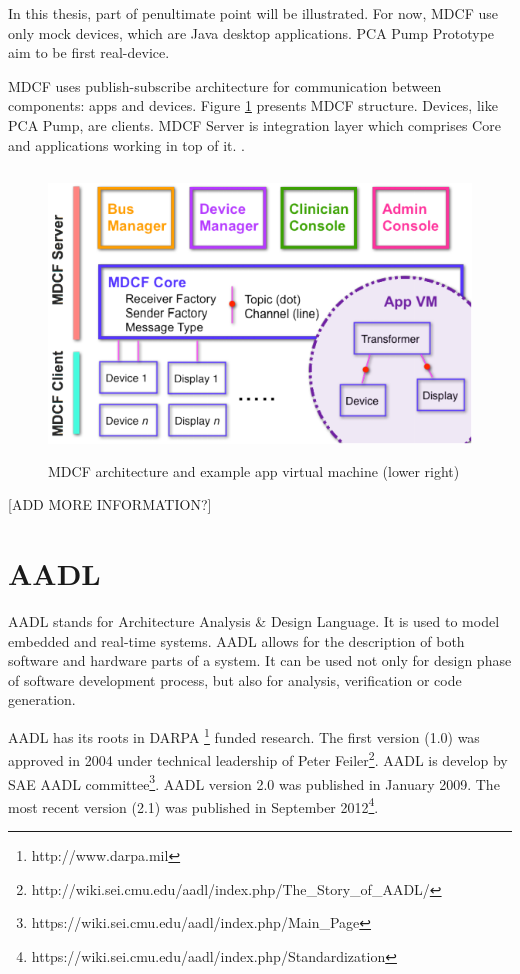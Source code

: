 In this thesis, part of penultimate point will be illustrated. For now, MDCF use only mock devices, which are Java desktop applications. PCA Pump Prototype aim to be first real-device.

MDCF uses publish-subscribe architecture for communication between components: apps and devices. Figure \ref{figure:mdcf} presents MDCF structure. Devices, like PCA Pump, are clients. MDCF Server is integration layer which comprises Core and applications working in top of it. \cite{MDCF:Paper}.

\begin{figure}[ht]%
    \begin{center}
    	\includegraphics[height=3in]{figures/mdcf.png}
    	\caption{MDCF architecture and example app virtual machine (lower right)}    	
    \end{center}
    \label{figure:mdcf}
\end{figure}

[ADD MORE INFORMATION?]



\section{AADL}
\label{background:aadl}

AADL stands for Architecture Analysis \& Design Language. It is used to model embedded and real-time systems. AADL allows for the description of both software and hardware parts of a system. It can be used not only for design phase of software development process, but also for analysis, verification or code generation.

AADL has its roots in DARPA \footnote{http://www.darpa.mil} funded research. The first version (1.0) was approved in 2004 under technical leadership of Peter Feiler\footnote{http://wiki.sei.cmu.edu/aadl/index.php/The\_Story\_of\_AADL/}. AADL is develop by SAE AADL committee\footnote{https://wiki.sei.cmu.edu/aadl/index.php/Main\_Page}. AADL version 2.0 was published in January 2009. The most recent version (2.1) was published in September 2012\footnote{https://wiki.sei.cmu.edu/aadl/index.php/Standardization}.

